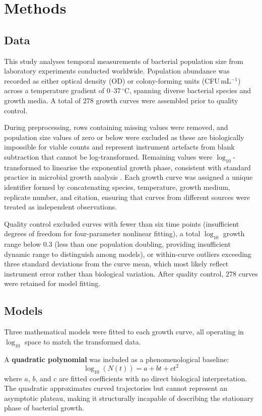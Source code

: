 \documentclass[11pt,a4paper]{article}
\begin{document}
\section{Methods}

\subsection{Data}

This study analyses temporal measurements of bacterial population size
from laboratory experiments conducted worldwide. Population abundance was
recorded as either optical density (OD) or colony-forming units
(CFU\,mL$^{-1}$) across a temperature gradient of 0--37\,$^\circ$C,
spanning diverse bacterial species and growth media. A total of 278
growth curves were assembled prior to quality control.

During preprocessing, rows containing missing values were removed, and
population size values of zero or below were excluded as these are
biologically impossible for viable counts and represent instrument
artefacts from blank subtraction that cannot be log-transformed.
Remaining values were $\log_{10}$-transformed to linearise the
exponential growth phase, consistent with standard practice in microbial
growth analysis \citep{Zwietering1990}. Each growth curve was assigned a
unique identifier formed by concatenating species, temperature, growth
medium, replicate number, and citation, ensuring that curves from
different sources were treated as independent observations.

Quality control excluded curves with fewer than six time points
(insufficient degrees of freedom for four-parameter nonlinear fitting),
a total $\log_{10}$ growth range below 0.3 (less than one population
doubling, providing insufficient dynamic range to distinguish among
models), or within-curve outliers exceeding three standard deviations
from the curve mean, which most likely reflect instrument error rather
than biological variation. After quality control, 278 curves were
retained for model fitting.

\subsection{Models}

Three mathematical models were fitted to each growth curve, all
operating in $\log_{10}$ space to match the transformed data.

A \textbf{quadratic polynomial} was included as a phenomenological
baseline:
\begin{equation}
    \log_{10}(N(t)) = a + bt + ct^2
\end{equation}
where $a$, $b$, and $c$ are fitted coefficients with no direct
biological interpretation. The quadratic approximates curved trajectories
but cannot represent an asymptotic plateau, making it structurally
incapable of describing the stationary phase of bacterial growth.
\end{document}
